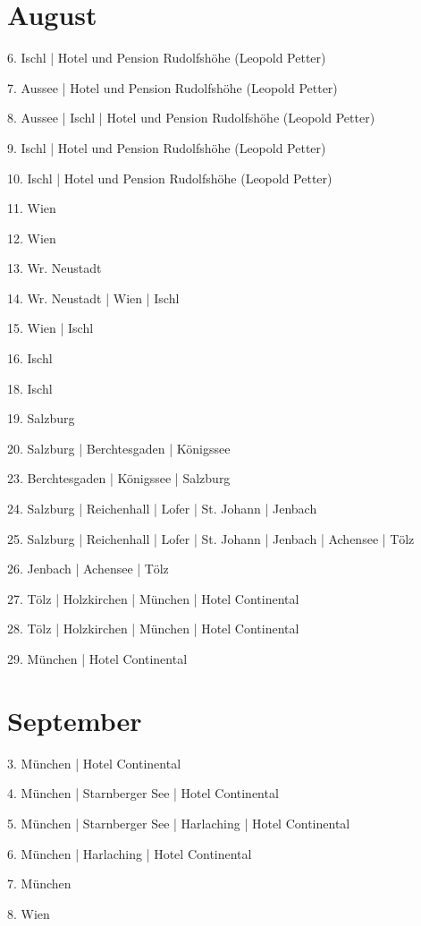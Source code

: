 \documentclass[twoside=false,titlepage=false,open=any, parskip=never, fontsize=10pt, headings=small, chapterprefix=false, appendixprefix=false, DIV=15]{scrbook}
\begin{document}
\begin{multicols}{3}
            \section*{August}
            6. Ischl | Hotel und Pension Rudolfshöhe (Leopold Petter)\par
            7. Aussee | Hotel und Pension Rudolfshöhe (Leopold Petter)\par
            8. Aussee | Ischl | Hotel und Pension Rudolfshöhe (Leopold Petter)\par
            9. Ischl | Hotel und Pension Rudolfshöhe (Leopold Petter)\par
            10. Ischl | Hotel und Pension Rudolfshöhe (Leopold Petter)\par
            11. Wien\par
            12. Wien\par
            13. Wr. Neustadt\par
            14. Wr. Neustadt | Wien | Ischl\par
            15. Wien | Ischl\par
            16. Ischl\par
            18. Ischl\par
            19. Salzburg\par
            20. Salzburg | Berchtesgaden | Königssee\par
            23. Berchtesgaden | Königssee | Salzburg\par
            24. Salzburg | Reichenhall | Lofer | St. Johann | Jenbach\par
            25. Salzburg | Reichenhall | Lofer | St. Johann | Jenbach | Achensee | Tölz\par
            26. Jenbach | Achensee | Tölz\par
            27. Tölz | Holzkirchen | München | Hotel Continental\par
            28. Tölz | Holzkirchen | München | Hotel Continental\par
            29. München | Hotel Continental\par
            \section*{September}
            3. München | Hotel Continental\par
            4. München | Starnberger See | Hotel Continental\par
            5. München | Starnberger See | Harlaching | Hotel Continental\par
            6. München | Harlaching | Hotel Continental\par
            7. München\par
            8. Wien\par

\end{multicols}
\end{document}
